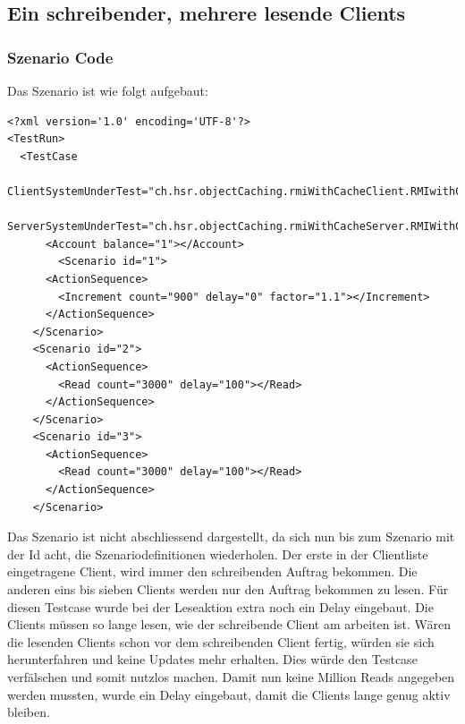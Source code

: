\subsection{Ein schreibender, mehrere lesende Clients}
\subsubsection{Szenario Code}
Das Szenario ist wie folgt aufgebaut:
\begin{lstlisting}
<?xml version='1.0' encoding='UTF-8'?>
<TestRun>
  <TestCase
    ClientSystemUnderTest="ch.hsr.objectCaching.rmiWithCacheClient.RMIwithCacheClientSystem"
    ServerSystemUnderTest="ch.hsr.objectCaching.rmiWithCacheServer.RMIWithCacheServerSystem">
      <Account balance="1"></Account>
        <Scenario id="1">
	  <ActionSequence>
	    <Increment count="900" delay="0" factor="1.1"></Increment>
	  </ActionSequence>
	</Scenario>
	<Scenario id="2">
	  <ActionSequence>
	    <Read count="3000" delay="100"></Read>
	  </ActionSequence>
	</Scenario>
	<Scenario id="3">
	  <ActionSequence>
	    <Read count="3000" delay="100"></Read>
	  </ActionSequence>
	</Scenario>
\end{lstlisting}

Das Szenario ist nicht abschliessend dargestellt, da sich nun bis zum Szenario mit der Id acht, die Szenariodefinitionen wiederholen. Der erste in der Clientliste eingetragene Client, wird immer den schreibenden Auftrag bekommen. Die anderen eins bis sieben Clients werden nur den Auftrag bekommen zu lesen. \newline
Für diesen Testcase wurde bei der Leseaktion extra noch ein Delay eingebaut. Die Clients müssen so lange lesen, wie der schreibende Client am arbeiten ist. Wären die lesenden Clients schon vor dem schreibenden Client fertig, würden sie sich herunterfahren und keine Updates mehr erhalten. Dies würde den Testcase verfälschen und somit nutzlos machen. Damit nun keine Million Reads angegeben werden mussten, wurde ein Delay eingebaut, damit die Clients lange genug aktiv bleiben. 

